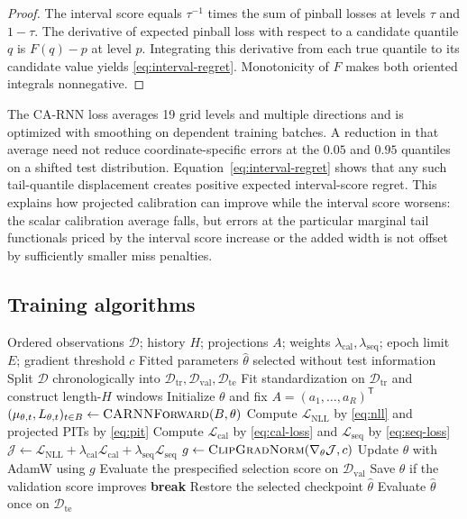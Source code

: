 \documentclass[11pt]{article}
\newcommand{\D}{\mathcal{D}}
\begin{document}
\begin{proof}
The interval score equals $\tau^{-1}$ times the sum of pinball losses at levels
$\tau$ and $1-\tau$. The derivative of expected pinball loss with respect to a
candidate quantile $q$ is $F(q)-p$ at level $p$. Integrating this derivative from
each true quantile to its candidate value yields \eqref{eq:interval-regret}.
Monotonicity of $F$ makes both oriented integrals nonnegative.
\end{proof}

The CA-RNN loss averages 19 grid levels and multiple directions and is optimized
with smoothing on dependent training batches. A reduction in that average need
not reduce coordinate-specific errors at the $0.05$ and $0.95$ quantiles on a
shifted test distribution. Equation~\eqref{eq:interval-regret} shows that any such
tail-quantile displacement creates positive expected interval-score regret. This
explains how projected calibration can improve while the interval score worsens:
the scalar calibration average falls, but errors at the particular marginal tail
functionals priced by the interval score increase or the added width is not offset
by sufficiently smaller miss penalties.

\subsection{Training algorithms}

\begin{algorithm}[ht]
\caption{Frequentist CA-RNN training}
\label{alg:ca-rnn}
\begin{algorithmic}[1]
\Require Ordered observations $\D$; history $H$; projections $A$; weights
$\lambda_{\mathrm{cal}},\lambda_{\mathrm{seq}}$; epoch limit $E$;
gradient threshold $c$
\Ensure Fitted parameters $\widehat\theta$ selected without test information
\State Split $\D$ chronologically into $\D_{\mathrm{tr}},\D_{\mathrm{val}},
\D_{\mathrm{te}}$
\State Fit standardization on $\D_{\mathrm{tr}}$ and construct length-$H$ windows
\State Initialize $\theta$ and fix $A=(a_1,\ldots,a_R)^{\mathsf T}$
    \For{consecutive mini-batch $B\subset\D_{\mathrm{tr}}$}
        \State $(\mu_{\theta,t},L_{\theta,t})_{t\in B}
        \gets \Call{CARNNForward}{B,\theta}$
        \State Compute $\mathcal L_{\mathrm{NLL}}$ by \eqref{eq:nll} and
        projected PITs by \eqref{eq:pit}
        \State Compute $\mathcal L_{\mathrm{cal}}$ by \eqref{eq:cal-loss} and
        $\mathcal L_{\mathrm{seq}}$ by \eqref{eq:seq-loss}
        \State $\mathcal J\gets\mathcal L_{\mathrm{NLL}}
        +\lambda_{\mathrm{cal}}\mathcal L_{\mathrm{cal}}
        +\lambda_{\mathrm{seq}}\mathcal L_{\mathrm{seq}}$
        \State $g\gets\Call{ClipGradNorm}{\nabla_\theta\mathcal J,c}$
        \State Update $\theta$ with AdamW using $g$
    \EndFor
    \State Evaluate the prespecified selection score on $\D_{\mathrm{val}}$
    \State Save $\theta$ if the validation score improves
     \State \textbf{break} \EndIf
\EndFor
\State Restore the selected checkpoint $\widehat\theta$
\State Evaluate $\widehat\theta$ once on $\D_{\mathrm{te}}$
\end{algorithmic}
\end{algorithm}
\end{document}
